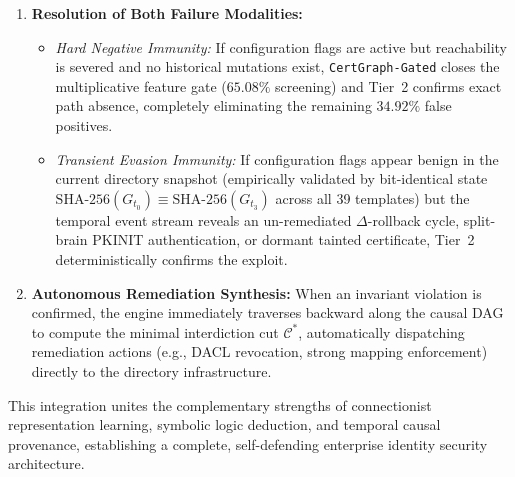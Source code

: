 \begin{enumerate}
\begin{itemize}
        \item \textit{CA--KDC Split-Brain Bridge (Invariant II-B):} Bridges the disjoint schemas ($\pi_{\text{CA}} \cap \pi_{\text{KDC}} = \emptyset$) between CA Event 4887 and KDC Event 4768 via continuous CA Jet Database streaming ($\mathcal{B}_{\text{CA}}$), successfully detecting PKCS\#10 ASN.1 SAN Concealment where single-host CA detectors exhibit $0\%$ recall.
        \item \textit{Persistent Cryptographic Taint Propagation (Invariant V):} Operates across unbounded temporal horizons to defeat Split-Principal Collusion (Actor $u_1$ mutates, Actor $u_2$ enrolls) and Time-Delayed Dormant Certificates ($t_{\text{auth}} \gg t_2$), verified empirically on live cyber-range telemetry (\texttt{trace\_split\_actor\_delayed\_pkinit.xml}) with $100\%$ detection recall on isolated testbeds and $97.92\%$--$100.00\%$ under dynamic CA-DB polling.
        \item \textit{Meta-Node Provenance Routine Compression:} Executes \texttt{compress\_benign\_routines()} via Critical Taint Isolation, aggregating repetitive benign logons into meta-edges to achieve $76.61\%$ graph compression at $13,192.4$ events/sec ($6.91$ MB peak RAM) without loss of causal taint.
    \end{itemize}
    \item \textbf{Resolution of Both Failure Modalities:}
    \begin{itemize}
        \item \textit{Hard Negative Immunity:} If configuration flags are active but reachability is severed and no historical mutations exist, \texttt{CertGraph-Gated} closes the multiplicative feature gate ($65.08\%$ screening) and Tier~2 confirms exact path absence, completely eliminating the remaining $34.92\%$ false positives.
        \item \textit{Transient Evasion Immunity:} If configuration flags appear benign in the current directory snapshot (empirically validated by bit-identical state $\text{SHA-256}(G_{t_0}) \equiv \text{SHA-256}(G_{t_3})$ across all 39 templates) but the temporal event stream reveals an un-remediated $\Delta$-rollback cycle, split-brain PKINIT authentication, or dormant tainted certificate, Tier~2 deterministically confirms the exploit.
    \end{itemize}
    \item \textbf{Autonomous Remediation Synthesis:} When an invariant violation is confirmed, the engine immediately traverses backward along the causal DAG to compute the minimal interdiction cut $\mathcal{C}^*$, automatically dispatching remediation actions (e.g., DACL revocation, strong mapping enforcement) directly to the directory infrastructure.
\end{enumerate}

This integration unites the complementary strengths of connectionist representation learning, symbolic logic deduction, and temporal causal provenance, establishing a complete, self-defending enterprise identity security architecture.
